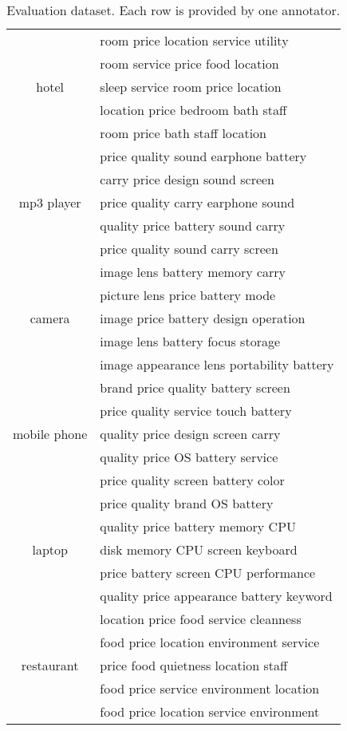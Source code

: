 \documentclass{article}
\begin{document}
	\begin{table}[th!]
		\small
		\centering
		\caption{Evaluation dataset. Each row is provided by one annotator.}
		\label{table:labels}
		\begin{tabular}{|c|l|}
			\hline
			\multirow{5}{*}{hotel}
			& room price location service utility \\
			& room service price food location  \\
			& sleep service room price location  \\
			& location price bedroom bath staff  \\
			& room price bath staff location  \\\hline
			\multirow{5}{*}{mp3 player}
			& price quality sound earphone battery \\
			& carry price design sound screen  \\ 
			& price quality carry earphone sound \\
			& quality price battery sound carry \\
			& price quality sound carry screen
			\\\hline
			\multirow{5}{*}{camera}
			& image lens battery memory carry \\
			& picture lens price battery mode \\
			& image price battery design operation \\
			& image lens battery focus storage \\
			& image appearance lens portability battery \\\hline
			\multirow{5}{*}{mobile phone}
			& brand price quality battery screen \\
			& price quality service touch battery \\
			& quality price design screen carry \\
			& quality price OS battery service \\
			& price quality screen battery color \\\hline
			
			\multirow{5}{*}{laptop}
			& price quality brand OS battery \\
			& quality price battery memory CPU \\
			& disk memory CPU screen keyboard \\
			& price battery screen CPU performance \\ 
			& quality price appearance battery keyword \\\hline
			
			\multirow{5}{*}{restaurant}
			& location price food service cleanness \\
			& food price location environment service \\
			& price food quietness location staff \\
			& food price service environment location \\
			& food price location service environment \\\hline
			
		\end{tabular}
	\end{table}
	
\end{document}
